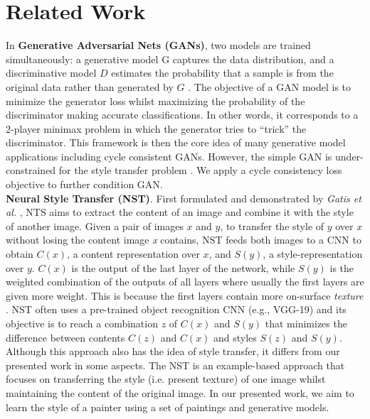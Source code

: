 \documentclass[10pt,twocolumn,letterpaper]{article}
\begin{document}
\section{Related Work}
In \textbf{Generative Adversarial Nets (GANs)}, two models are trained simultaneously: a generative model G captures the data distribution, and a discriminative model $D$ estimates the probability that a sample is from the original data rather than generated by $G$ \cite{simplegan}. The objective of a GAN model is to minimize the generator loss whilst maximizing the probability of the discriminator making accurate classifications. In other words, it corresponds to a 2-player minimax problem in which the generator tries to “trick” the discriminator. This framework is then the core idea of many generative model applications including cycle consistent GANs. However, the simple GAN is under-constrained for the style transfer problem \cite{cyclegan}. We apply a cycle consistency loss objective to further condition GAN.  
\\
\textbf{Neural Style Transfer (NST)}. First formulated and demonstrated by \textit{Gatis et al.} \cite{NST}, NTS aims to extract the content of an image and combine it with the style of another image. Given a pair of images $x$ and $y$, to transfer the style of $y$ over $x$ without losing the content image \textit{x} contains, NST feeds both images to a CNN \cite{cnn} to obtain $C(x)$, a content representation over $x$, and $S(y)$, a style-representation over $y$. $C(x)$ is the output of the last layer of the network, while $S(y)$ is the weighted combination of the outputs of all layers where usually the first layers are given more weight. This is because the first layers contain more on-surface \textit{texture} \cite{texture}. NST often uses a pre-trained object recognition CNN (e.g., VGG-19) and its objective is to reach a combination $z$ of $C(x)$ and $S(y)$ that minimizes the difference between contents $C(z)$ and $C(x)$ and styles $S(z)$ and $S(y)$. Although this approach also has the idea of style transfer, it differs from our presented work in some aspects. The NST is an example-based approach that focuses on transferring the style (i.e. present texture) of one image whilst maintaining the content of the original image. In our presented work, we aim to learn the style of a painter using a set of paintings and generative models. 
\\
\end{document}
